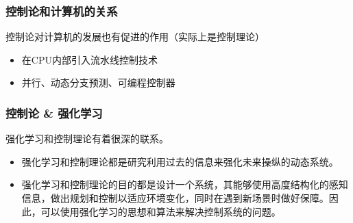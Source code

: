 \documentclass[12pt,AutoFakeBold,aspectratio=43,mathserif]{beamer}
\begin{document}
    \begin{frame}
        \frametitle{控制论和计算机的关系}
        控制论对计算机的发展也有促进的作用（实际上是控制理论） \pause
        \begin{itemize}
            \item 在CPU内部引入流水线控制技术

            \item 并行、动态分支预测、可编程控制器
        \end{itemize}
        
    \end{frame}
    \begin{frame}
        \frametitle{控制论 \& 强化学习}
        强化学习和控制理论有着很深的联系。 \pause
        \begin{itemize}
            \item  强化学习和控制理论都是研究利用过去的信息来强化未来操纵的动态系统。\pause
            \item  强化学习和控制理论的目的都是设计一个系统，其能够使用高度结构化的感知信息，做出规划和控制以适应环境变化，同时在遇到新场景时做好保障。因此，可以使用强化学习的思想和算法来解决控制系统的问题。 
        \end{itemize}
    \end{frame}
\end{document}
